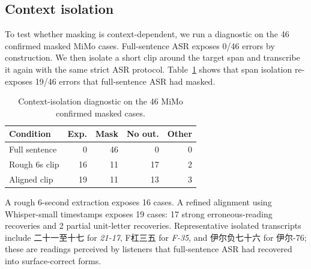 \documentclass{article}
\begin{document}
\begin{table}[H]
\centering
\caption{Representative confirmed masked cases and masking routes.}
\label{tab:examples}
\scriptsize
{}
\end{table}

\subsection{Context isolation}

To test whether masking is context-dependent, we run a diagnostic on the 46 confirmed masked MiMo cases. Full-sentence ASR exposes 0/46 errors by construction. We then isolate a short clip around the target span and transcribe it again with the same strict ASR protocol. Table~\ref{tab:isolation} shows that span isolation re-exposes 19/46 errors that full-sentence ASR had masked.

\begin{table}[H]
\centering
\caption{Context-isolation diagnostic on the 46 MiMo confirmed masked cases.}
\label{tab:isolation}
\begin{tabular}{lrrrr}
\toprule
Condition & Exp. & Mask & No out. & Other \\
\midrule
Full sentence & 0 & 46 & 0 & 0 \\
Rough 6s clip & 16 & 11 & 17 & 2 \\
Aligned clip & 19 & 11 & 13 & 3 \\
\bottomrule
\end{tabular}
\end{table}

A rough 6-second extraction exposes 16 cases. A refined alignment using Whisper-small timestamps exposes 19 cases: 17 strong erroneous-reading recoveries and 2 partial unit-letter recoveries. Representative isolated transcripts include 二十一至十七 for \emph{21-17}, F杠三五 for \emph{F-35}, and 伊尔负七十六 for 伊尔-76; these are readings perceived by listeners that full-sentence ASR had recovered into surface-correct forms.
\end{document}
